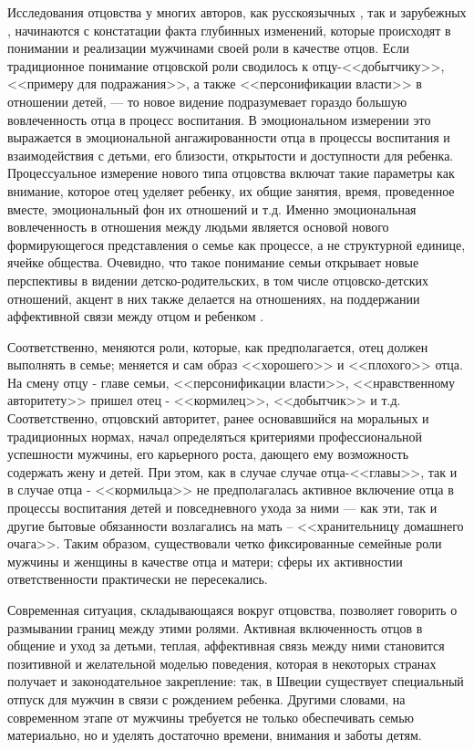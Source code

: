 \documentclass{../../common/thesisbyxetex}
\begin{document}
Исследования отцовства у многих авторов, как русскоязычных \cite{relot, psyot}, так и зарубежных
\cite{meta, morfat, legfat}, начинаются с констатации факта глубинных изменений, которые происходят
в понимании и реализации мужчинами своей роли в качестве отцов. Если традиционное понимание
отцовской роли сводилось к отцу-<<добытчику>>, <<примеру для подражания>>, а также
<<персонификации власти>> в отношении детей, --- то новое видение подразумевает гораздо большую
вовлеченность отца в процесс воспитания. В эмоциональном измерении это выражается в  эмоциональной
ангажированности отца в процессы воспитания и взаимодействия с детьми, его близости, открытости и
доступности для ребенка. Процессуальное измерение нового типа отцовства включат такие параметры как
внимание, которое отец уделяет ребенку, их общие занятия, время, проведенное вместе, эмоциональный
фон их отношений и т.д.
Именно эмоциональная вовлеченность в отношения между людьми является основой нового формирующегося
представления о семье как процессе, а не структурной единице, ячейке общества. Очевидно, что такое
понимание семьи открывает новые перспективы в видении детско-родительских, в том числе
отцовско-детских отношений, акцент в них также делается на отношениях, на поддержании
аффективной
связи между отцом и ребенком \cite[15]{fatpsy}.

Соответственно, меняются роли, которые, как предполагается, отец должен выполнять в семье; меняется
и сам образ <<хорошего>> и  <<плохого>> отца. На смену отцу - главе семьи, <<персонификации
власти>>,
<<нравственному авторитету>> пришел отец - <<кормилец>>, <<добытчик>> и т.д. Соответственно,
отцовский авторитет, ранее основавшийся на моральных и традиционных нормах, начал определяться
критериями профессиональной успешности мужчины, его карьерного роста, дающего ему возможность
содержать жену и детей. При этом, как в случае случае отца-<<главы>>, так и в случае отца -
<<кормильца>> не предполагалась активное включение отца в процессы воспитания детей и повседневного
ухода за ними --- как эти, так и другие бытовые обязанности возлагались на мать -- <<хранительницу
домашнего очага>>. Таким образом, существовали четко фиксированные семейные роли мужчины и женщины
в качестве отца и матери; сферы их активностии ответственности практически не пересекались.

Современная ситуация, складывающаяся вокруг отцовства, позволяет говорить о размывании границ между
этими ролями. Активная включенность отцов в общение и уход за детьми, теплая, аффективная связь
между ними становится позитивной и желательной моделью поведения, которая в некоторых странах
получает и законодательное закрепление: так, в Швеции существует специальный отпуск для мужчин в
связи с рождением ребенка. Другими словами, на современном  этапе от мужчины требуется не только
обеспечивать семью
материально, но и уделять
достаточно времени, внимания и заботы детям.
\end{document}
